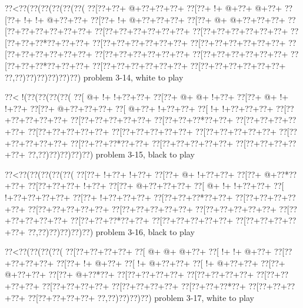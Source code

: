 \vbox{\vbox{\goo
\0??<\0??(\0??(\0??(\0??(\0??(\0??(
\0??[\0??+\0??+\- @+\0??+\0??+\0??+
\0??[\0??+\- !+\- @+\0??+\- @+\0??+
\0??[\0??+\- !+\- !+\- @+\0??+\0??+
\0??[\0??+\- !+\- @+\0??+\0??+\0??+
\0??[\0??+\- @+\- @+\0??+\0??+\0??+
\0??[\0??+\0??+\0??+\0??+\0??+\0??+
\0??[\0??+\0??+\0??+\0??+\0??+\0??+
\0??[\0??+\0??+\0??+\0??+\0??+\0??+
\0??[\0??+\0??+\0??*\0??+\0??+\0??+
\0??[\0??+\0??+\0??+\0??+\0??+\0??+
\0??[\0??+\0??+\0??+\0??+\0??+\0??+
\0??[\0??+\0??+\0??+\0??+\0??+\0??+
\0??[\0??+\0??+\0??+\0??+\0??+\0??+
\0??[\0??+\0??+\0??+\0??+\0??+\0??+
\0??[\0??+\0??+\0??*\0??+\0??+\0??+
\0??[\0??+\0??+\0??+\0??+\0??+\0??+
\0??[\0??+\0??+\0??+\0??+\0??+\0??+
\0??,\0??)\0??)\0??)\0??)\0??)\0??)
}
\hfil problem 3-14, white to play\hfil\break
}

\vbox{\vbox{\goo
\0??<\- !(\0??(\0??(\0??(\0??(
\0??[\- @+\- !+\- !+\0??+\0??+
\0??[\0??+\- @+\- @+\- !+\0??+
\0??[\0??+\- @+\- !+\- !+\0??+
\0??[\0??+\- @+\0??+\0??+\0??+
\0??[\- @+\0??+\- !+\0??+\0??+
\0??[\- !+\- !+\0??+\0??+\0??+
\0??[\0??+\0??+\0??+\0??+\0??+
\0??[\0??+\0??+\0??+\0??+\0??+
\0??[\0??+\0??+\0??*\0??+\0??+
\0??[\0??+\0??+\0??+\0??+\0??+
\0??[\0??+\0??+\0??+\0??+\0??+
\0??[\0??+\0??+\0??+\0??+\0??+
\0??[\0??+\0??+\0??+\0??+\0??+
\0??[\0??+\0??+\0??+\0??+\0??+
\0??[\0??+\0??+\0??*\0??+\0??+
\0??[\0??+\0??+\0??+\0??+\0??+
\0??[\0??+\0??+\0??+\0??+\0??+
\0??,\0??)\0??)\0??)\0??)\0??)
}
\hfil problem 3-15, black to play\hfil\break
}

\vbox{\vbox{\goo
\0??<\0??(\0??(\0??(\0??(\0??(
\0??[\0??+\- !+\0??+\- !+\0??+
\0??[\0??+\- @+\- !+\0??+\0??+
\0??[\0??+\- @+\0??*\0??+\0??+
\0??[\0??+\0??+\0??+\- !+\0??+
\0??[\0??+\- @+\0??+\0??+\0??+
\0??[\- @+\- !+\- !+\0??+\0??+
\0??[\- !+\0??+\0??+\0??+\0??+
\0??[\0??+\- !+\0??+\0??+\0??+
\0??[\0??+\0??+\0??*\0??+\0??+
\0??[\0??+\0??+\0??+\0??+\0??+
\0??[\0??+\0??+\0??+\0??+\0??+
\0??[\0??+\0??+\0??+\0??+\0??+
\0??[\0??+\0??+\0??+\0??+\0??+
\0??[\0??+\0??+\0??+\0??+\0??+
\0??[\0??+\0??+\0??*\0??+\0??+
\0??[\0??+\0??+\0??+\0??+\0??+
\0??[\0??+\0??+\0??+\0??+\0??+
\0??,\0??)\0??)\0??)\0??)\0??)
}
\hfil problem 3-16, black to play\hfil\break
}

\vbox{\vbox{\goo
\0??<\0??(\0??(\0??(\0??(
\0??[\0??+\0??+\0??+\0??+
\0??[\- @+\- @+\- @+\0??+
\0??[\- !+\- !+\- @+\0??+
\0??[\0??+\0??+\0??+\0??+
\0??[\0??+\- !+\- @+\0??+
\0??[\- !+\- @+\0??+\0??+
\0??[\- !+\- @+\0??+\0??+
\0??[\0??+\- @+\0??+\0??+
\0??[\0??+\- @+\0??*\0??+
\0??[\0??+\0??+\0??+\0??+
\0??[\0??+\0??+\0??+\0??+
\0??[\0??+\0??+\0??+\0??+
\0??[\0??+\0??+\0??+\0??+
\0??[\0??+\0??+\0??+\0??+
\0??[\0??+\0??+\0??*\0??+
\0??[\0??+\0??+\0??+\0??+
\0??[\0??+\0??+\0??+\0??+
\0??,\0??)\0??)\0??)\0??)
}
\hfil problem 3-17, white to play\hfil\break
}

